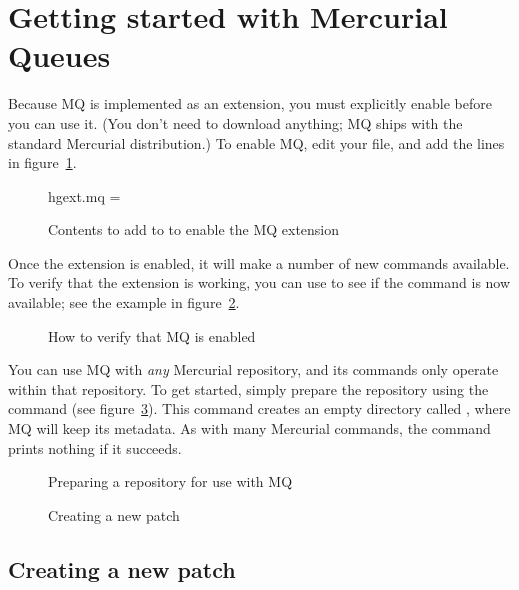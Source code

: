 \section{Getting started with Mercurial Queues}
\label{sec:mq:start}

Because MQ is implemented as an extension, you must explicitly enable
before you can use it.  (You don't need to download anything; MQ ships
with the standard Mercurial distribution.)  To enable MQ, edit your
 file, and add the lines in figure~\ref{ex:mq:config}.

\begin{figure}[ht]
  \begin{codesample4}
    [extensions]
    hgext.mq =
  \end{codesample4}
  \label{ex:mq:config}
  \caption{Contents to add to  to enable the MQ extension}
\end{figure}

Once the extension is enabled, it will make a number of new commands
available.  To verify that the extension is working, you can use
 to see if the  command is now available; see
the example in figure~\ref{ex:mq:enabled}.

\begin{figure}[ht]
  \caption{How to verify that MQ is enabled}
  \label{ex:mq:enabled}
\end{figure}

You can use MQ with \emph{any} Mercurial repository, and its commands
only operate within that repository.  To get started, simply prepare
the repository using the  command (see
figure~\ref{ex:mq:qinit}).  This command creates an empty directory
called , where MQ will keep its metadata.  As
with many Mercurial commands, the  command prints nothing
if it succeeds.

\begin{figure}[ht]
  \caption{Preparing a repository for use with MQ}
  \label{ex:mq:qinit}
\end{figure}

\begin{figure}[ht]
  \caption{Creating a new patch}
  \label{ex:mq:qnew}
\end{figure}

\subsection{Creating a new patch}

